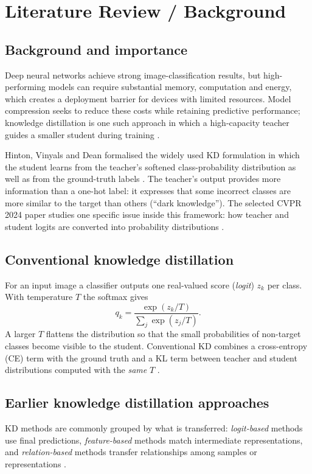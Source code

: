 \documentclass[12pt,a4paper]{article}
\begin{document}
\section{Literature Review / Background}
\subsection{Background and importance}
Deep neural networks achieve strong image-classification results, but high-performing models can require substantial memory, computation and energy, which creates a deployment barrier for devices with limited resources. Model compression seeks to reduce these costs while retaining predictive performance; knowledge distillation is one such approach in which a high-capacity teacher guides a smaller student during training \cite{hu2023,mansourian2025}.

Hinton, Vinyals and Dean formalised the widely used KD formulation in which the student learns from the teacher's softened class-probability distribution as well as from the ground-truth labels \cite{hinton2015}. The teacher's output provides more information than a one-hot label: it expresses that some incorrect classes are more similar to the target than others (``dark knowledge''). The selected CVPR 2024 paper studies one specific issue inside this framework: how teacher and student logits are converted into probability distributions \cite{sun2024}.

\subsection{Conventional knowledge distillation}
For an input image a classifier outputs one real-valued score (\emph{logit}) $z_k$ per class. With temperature $T$ the softmax gives
\begin{equation}
q_k = \frac{\exp(z_k/T)}{\sum_{j}\exp(z_j/T)} .
\label{eq:softmax}
\end{equation}
A larger $T$ flattens the distribution so that the small probabilities of non-target classes become visible to the student. Conventional KD combines a cross-entropy (CE) term with the ground truth and a KL term between teacher and student distributions computed with the \emph{same} $T$ \cite{hinton2015}.

\subsection{Earlier knowledge distillation approaches}
KD methods are commonly grouped by what is transferred: \emph{logit-based} methods use final predictions, \emph{feature-based} methods match intermediate representations, and \emph{relation-based} methods transfer relationships among samples or representations \cite{hu2023,mansourian2025,sun2024}.
\end{document}
